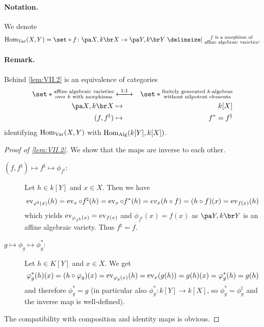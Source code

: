 \documentclass[12pt,a4paper]{scrartcl}
\theoremstyle{cplain}
\theoremstyle{cplain}
\theoremstyle{cplain}
\theoremstyle{definition}
\begin{document}
\begin{otherlanguage}{english}
\paragraph{Notation.} We denote \[\Hom_{\Var}(X,Y) = \set*{f\colon \aav X \to \aav Y \given \substack{\text{$f$ is a morphism of}\\\text{affine algebraic varieties}}}.\]

\paragraph{Remark.}
Behind \cref{lem:VII.2} is an equivalence of categories
\begin{eqnarray*}
  \set*{\substack{\text{affine algebraic varieties}\\\text{over $k$ with morphisms}}} &\xlongleftrightarrow{1:1}& \set*{\substack{\text{finitely generated $k$-algebras}\\\text{without nilpotent elements}}} \\
  \aav X &\mapsto& k[X] \\
  (f,f^\natural) &\mapsto& f^* = f^\natural
\end{eqnarray*}
identifying $\operatorname{Hom}_{\operatorname{Var}}(X,Y)$ with $\operatorname{Hom}_{\operatorname{Alg}}(k[Y],k[X])$.

\begin{proof}[Proof of \cref{lem:VII.2}]
  We show that the maps are inverse to each other.
  \begin{description}
    \item[$(f,f^\natural)\mapsto f^\natural \mapsto \phi_{f^\natural}$:] Let $h\in k[Y]$ and $x \in X$. Then we have
    \begin{align*}
      \operatorname{ev}_{\varphi^\natural(x)}(h) = \operatorname{ev}_x \circ f^\natural(h) = \operatorname{ev}_x \circ f^*(h) = ev_x(h\circ f) = (h \circ f)(x) = \operatorname{ev}_{f(x)}(h)
    \end{align*}
    which yields $\operatorname{ev}_{\varphi_{f^\natural}(x)} = \operatorname{ev}_{f(x)}$ and $\phi_{f^\natural}(x) = f(x)$ as $\aav Y$ is an affine algebraic variety. Thus $f^\natural = f$.
  \item[$g \mapsto \phi_g \mapsto \phi_g^*$:] Let $h \in K[Y]$ and $x \in X$. We get \[ \varphi_g^*(h)(x) = (h\circ \varphi_g)(x) = \operatorname{ev}_{\varphi_g(x)}(h) = \operatorname{ev}_x(g(h)) = g(h)(x) = \varphi_{g}^*(h) = g(h) \] and therefore $\phi_g^* = g$ (in particular also $\phi_g^* \colon k[Y] \to k[X]$, so $\phi_g^* = \phi_g^\natural$ and the inverse map is well-defined).
  \end{description}
  The compatibility with composition and identity maps is obvious.
\end{proof}


\end{otherlanguage}
\end{document}
